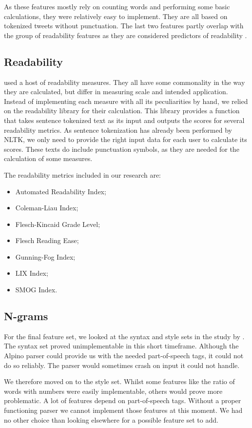 \documentclass[
10pt, %
a4paper, %
oneside, %
headinclude,footinclude, %
] {book}%
\begin{document}
As these features mostly rely on counting words and performing some basic calculations, they were relatively easy to implement. They are all based on tokenized tweets without punctuation. The last two features partly overlap with the group of readability features as they are considered predictors of readability \citep{flekova}.

\subsection{Readability}
\citet{flekova} used a host of readability measures. They all have some commonality in the way they are calculated, but differ in measuring scale and intended application. Instead of implementing each measure with all its peculiarities by hand, we relied on the readability library \citep{readability} for their calculation. This library provides a function that takes sentence tokenized text as its input and outputs the scores for several readability metrics. As sentence tokenization has already been performed by NLTK, we only need to provide the right input data for each user to calculate its scores. These texts do include punctuation symbols, as they are needed for the calculation of some measures.

The readability metrics included in our research are:
\begin{itemize}
\item Automated Readability Index;
\item Coleman-Liau Index;
\item Flesch-Kincaid Grade Level;
\item Flesch Reading Ease;
\item Gunning-Fog Index;
\item LIX Index;
\item SMOG Index.
\end{itemize}

\subsection{N-grams}
For the final feature set, we looked at the syntax and style sets in the study by \citet{flekova}. 
The syntax set proved unimplementable in this short timeframe. Although the Alpino parser \citep{alpino} could provide us with the needed part-of-speech tags, it could not do so reliably. The parser would sometimes crash on input it could not handle.

We therefore moved on to the style set. Whilst some features like the ratio of words with numbers were easily implementable, others would prove more problematic. A lot of features depend on part-of-speech tags. Without a proper functioning parser we cannot implement those features at this moment. 
We had no other choice than looking elsewhere for a possible feature set to add.
\end{document}
